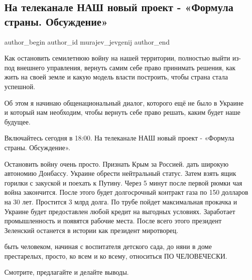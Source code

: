  
 
 
 
 
 
\subsection{На телеканале НАШ новый проект - «Формула страны. Обсуждение»}
\label{sec:26_11_2021.fb.murajev_jevgenij.1.formula_strany}
 
\ifcmt
 author_begin
   author_id murajev_jevgenij
 author_end
\fi


Как остановить семилетнюю войну на нашей территории, полностью выйти из-под
внешнего управления, вернуть самим себе право принимать решения, как жить на
своей земле и какую модель власти построить, чтобы страна стала успешной. 

Об этом я начинаю общенациональный диалог, которого ещё не было в Украине и
который нам необходим, чтобы вернуть себе право решать, каким будет наше
будущее. 

Включайтесь сегодня в 18:00. На телеканале НАШ новый проект - «Формула страны.
Обсуждение». 

\vspace{1cm}

\begin{cmtfront}

Остановить войну очень просто. Признать Крым за Россией. дать широкую автономию
Донбассу. Украине обрести нейтральный статус. Затем взять ящик горилки с
закуской и поехать к Путину. Через 5 минут после первой рюмки чая война
закончится. После этого будет долгосрочный контракт газа по 150 долларов на 30
лет. Простится 3 млрд долга. По трубе пойдет максимальная прокачка и Украине
будет предоставлен любой кредит на выгодных условиях. Заработает промышленность
и появятся рабочие места. После всего этого президент Зеленский останется в
истории как президент миротворец.	


быть человеком, начиная с воспитателя детского сада, до няни в доме
престарелых, просто, ко всем и ко всему, относиться ПО ЧЕЛОВЕЧЕСКИ.

\end{cmtfront}

Смотрите, предлагайте и делайте выводы.

